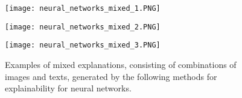 \documentclass[final,1p,times]{elsarticle}
\begin{document}
\begin{figure}[!ht]

\begin{minipage}{0.99\textwidth}
    \centering
    \texttt{[image: neural\_networks\_mixed\_1.PNG]}
\end{minipage}    
\begin{minipage}{0.49\textwidth}
   \centering
   \texttt{[image: neural\_networks\_mixed\_2.PNG]}
\end{minipage}    
\begin{minipage}{0.49\textwidth}
    \centering
    \texttt{[image: neural\_networks\_mixed\_3.PNG]}
\end{minipage}   
  \caption{Examples of mixed explanations, consisting of combinations of images and texts, generated by the following methods for explainability for neural networks.}
  \label{fig:neural_networks_mixed}

\end{figure}
\end{document}
